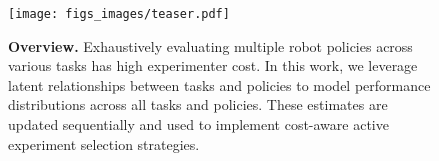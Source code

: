 \begin{figure}[t]
    \centering
    \texttt{[image: figs\_images/teaser.pdf]}
    \caption{\textbf{Overview.} 
    Exhaustively evaluating multiple robot policies across various tasks has high experimenter cost.
    In this work, we leverage latent relationships between tasks and policies to model performance distributions across all tasks and policies. 
    These estimates are updated sequentially and used to implement cost-aware active experiment selection strategies.
    }
    \label{fig:teaser}
\end{figure}